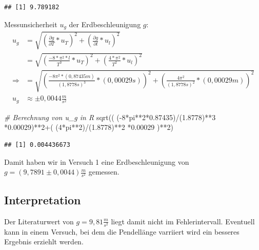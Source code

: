 \documentclass[
  9pt,
]{article}
\newenvironment{Shaded}{\begin{snugshade}}{\end{snugshade}}
\newcommand{\CommentTok}[1]{\textcolor[rgb]{0.56,0.35,0.01}{\textit{#1}}}
\newcommand{\DecValTok}[1]{\textcolor[rgb]{0.00,0.00,0.81}{#1}}
\newcommand{\FloatTok}[1]{\textcolor[rgb]{0.00,0.00,0.81}{#1}}
\newcommand{\FunctionTok}[1]{\textcolor[rgb]{0.00,0.00,0.00}{#1}}
\newcommand{\NormalTok}[1]{#1}
\newcommand{\SpecialCharTok}[1]{\textcolor[rgb]{0.00,0.00,0.00}{#1}}
\begin{document}
\begin{verbatim}
## [1] 9.789182
\end{verbatim}

Messunsicherheit \(u_g\) der Erdbeschleunigung \(g\): \begin{equation*}
\begin{split}
u_g&=\sqrt{(\frac{\partial g}{\partial T}*u_T)^2+(\frac{\partial g}{\partial l}*u_l)^2}\\
   &=\sqrt{(\frac{-8*\pi^2*l}{T^3}*u_T)^2+(\frac{4*\pi^2}{T^2}*u_l)^2}\\
\Rightarrow &= \sqrt{(\frac{-8\pi^2*(0,87435m)}{(1,8778s)^3}*(0,00029s))^2+(\frac{4\pi^2}{(1,8778s)^2}*(0,00029m))^2}\\
u_g&\approx \pm 0,0044 \frac{m}{s^2}
\end{split}
\end{equation*}

\begin{Shaded}
\begin{Highlighting}[]
\CommentTok{\# Berechnung von u\_g in R}
\FunctionTok{sqrt}\NormalTok{(( (}\SpecialCharTok{{-}}\DecValTok{8}\SpecialCharTok{*}\NormalTok{pi}\SpecialCharTok{**}\DecValTok{2}\SpecialCharTok{*}\FloatTok{0.87435}\NormalTok{)}\SpecialCharTok{/}\NormalTok{(}\FloatTok{1.8778}\NormalTok{)}\SpecialCharTok{**}\DecValTok{3} \SpecialCharTok{*}\FloatTok{0.00029}\NormalTok{)}\SpecialCharTok{**}\DecValTok{2}\SpecialCharTok{+}\NormalTok{( (}\DecValTok{4}\SpecialCharTok{*}\NormalTok{pi}\SpecialCharTok{**}\DecValTok{2}\NormalTok{)}\SpecialCharTok{/}\NormalTok{(}\FloatTok{1.8778}\NormalTok{)}\SpecialCharTok{**}\DecValTok{2} \SpecialCharTok{*}\FloatTok{0.00029}\NormalTok{ )}\SpecialCharTok{**}\DecValTok{2}\NormalTok{)}
\end{Highlighting}
\end{Shaded}

\begin{verbatim}
## [1] 0.004436673
\end{verbatim}

Damit haben wir in Versuch 1 eine Erdbeschleunigung von
\(g=(9,7891 \pm 0,0044)\frac{m}{s^2}\) gemessen.

\hypertarget{interpretation}{%
\subsection{Interpretation}\label{interpretation}}

Der Literaturwert von \(g=9,81\frac{m}{s^2}\) liegt damit nicht im
Fehlerintervall. Eventuell kann in einem Versuch, bei dem die
Pendellänge varriiert wird ein besseres Ergebnis erziehlt werden.
\end{document}
